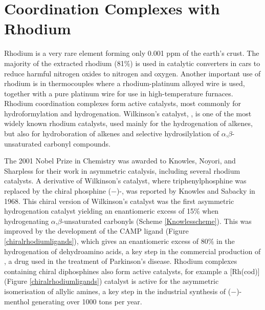 
\chapter{Coordination Complexes with Rhodium}
\label{ch:rhodium}

Rhodium is a very rare element forming only 0.001 ppm of the earth's crust.\cite{Enghag2004Rh}  The majority of the extracted rhodium (81\%) is used in catalytic converters in cars to reduce harmful nitrogen oxides to nitrogen and oxygen.\cite{Heck2001}  Another important use of rhodium is in thermocouples where a rhodium-platinum alloyed wire is used, together with a pure platinum wire for use in high-temperature furnaces.\cite{Enghag2004Rh}  Rhodium coordination complexes form active catalysts, most commonly for hydroformylation and hydrogenation.\cite{Leeuwenbook2000, Cui2005, Pospech2013}  Wilkinson's catalyst, , is one of the most widely known rhodium catalysts, used mainly for the hydrogenation of alkenes, but also for hydroboration of alkenes and selective hydrosilylation of $\alpha$,$\beta$-unsaturated carbonyl compounds.\cite{Osborn1966, Evans1988, Ojima1982}

The 2001 Nobel Prize in Chemistry was awarded to Knowles,\cite{Knowles2002} Noyori,\cite{Noyori2002} and Sharpless\cite{Sharpless2002} for their work in asymmetric catalysis, including several rhodium catalysts.  A derivative of Wilkinson's catalyst, where triphenylphosphine was replaced by the chiral phosphine ($-$)-, was reported by Knowles and Sabacky in 1968\cite{Knowles1968}.  This chiral version of Wilkinson's catalyst was the first asymmetric hydrogenation catalyst yielding an enantiomeric excess of 15\% when hydrogenating $\alpha$,$\beta$-unsaturated carbonyls (Scheme \ref{Knowlesscheme}).  This was improved by the development of the CAMP ligand (Figure \ref{chiralrhodiumligands}), which gives an enantiomeric excess of 80\% in the hydrogenation of dehydroamino acids, a key step in the commercial production of , a drug used in the treatment of Parkinson's disease.\cite{Noyori2007}  Rhodium complexes containing chiral diphosphines also form active catalysts, for example a [Rh(\acrshort{cod})] (Figure \ref{chiralrhodiumligands}) catalyst is active for the asymmetric isomerisation of allylic amines, a key step in the industrial synthesis of ($-$)-menthol generating over 1000 tons per year.\cite{Noyori2002}

